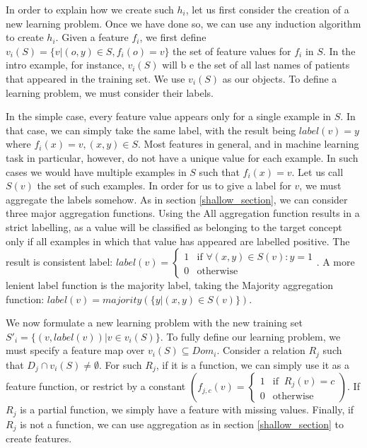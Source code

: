\documentclass[twoside,11pt]{article}
\theoremstyle{definition}
\begin{document}
In order to explain how we create such $h_{i}$, let us first consider the creation of a new learning problem. Once we have done so, we can use any induction algorithm to create $h_i$. 
Given a feature $f_{i}$, we first define $v_i(S) = \{v | (o,y) \in S, f_{i}(o)=v\}$ the set of feature values for $f_i$ in $S$. In the intro example, for instance, $v_i(S)$ will b
e the set of all last names of patients that appeared in the training set.
We use $v_i(S)$ as our objects. To define a learning problem, we must consider their labels. 

In the simple case, every feature value appears only for a single example in $S$. In that case, we can simply take the same label, with the result being $label(v)=y$ where $f_i(x)=v,(x,y)\in S$.
Most features in general, and in machine learning task in particular, however, do not have a unique value for each example. In such cases we would have multiple examples in $S$ such that $f_i(x)=v$. Let us call $S(v)$ the set of such examples. In order for us to give a label for $v$, we must aggregate the labels somehow. As in section \ref{shallow_section}, we can consider three major aggregation functions.
Using the All aggregation function results in a strict labelling, as a value will be classified as belonging to the target concept only if all examples in which that value has appeared are labelled positive. The result is consistent label: $label(v)=\begin{cases} 1 &\mbox{if } \forall (x,y)\in S(v): y=1\\ 
0 & \mbox{otherwise } \end{cases}$.
 A more lenient label function is the majority label, taking the Majority aggregation function: $label(v)=majority(\{y|(x,y)\in S(v)\})$.
 
We now formulate a new learning problem with the new training set
$S'_i = \{ (v, label(v)) | v \in v_i(S) \}$.
To fully define our learning problem, we must specify a feature map over $v_i(S)\subseteq Dom_i$. Consider a relation $R_j$ such that $D_j\cap v_i(S)\neq \emptyset$. For such $R_j$, if it is a function, we can simply use it as a feature function, or restrict by a constant $\left(f_{j,c}(v)=\begin{cases} 1 &\mbox{if } \ R_j(v)=c\\ 
0 & \mbox{otherwise } \end{cases}\right)$. If $R_j$ is a partial function, we simply have a feature with missing values. Finally, if $R_j$ is not a function, we can use aggregation as in section \ref{shallow_section} to create features.
\end{document}
